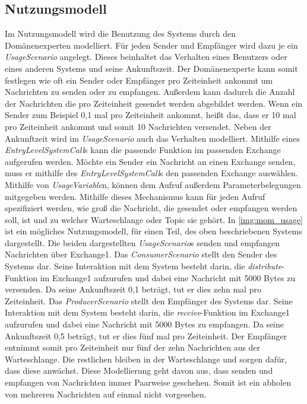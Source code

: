 \subsection{Nutzungsmodell}
Im Nutzungsmodell wird die Benutzung des Systems durch den Domänenexperten modelliert. Für jeden Sender und Empfänger wird dazu je ein \emph{UsageScenario} angelegt. Dieses beinhaltet das Verhalten eines Benutzers oder eines anderen Systems und seine Ankunftszeit. Der Domänenexperte kann somit festlegen wie oft ein Sender oder Empfänger pro Zeiteinheit ankommt um Nachrichten zu senden oder zu empfangen. Außerdem kann dadurch die Anzahl der Nachrichten die pro Zeiteinheit gesendet werden abgebildet werden. Wenn ein Sender zum Beispiel 0,1 mal pro Zeiteinheit ankommt, heißt das, dass er 10 mal pro Zeiteinheit ankommt und somit 10 Nachrichten versendet. Neben der Ankunftzeit wird im \emph{UsageScenario} auch das Verhalten modelliert. Mithilfe eines \emph{EntryLevelSystemCall}s kann die passende Funktion im passenden Exchange aufgerufen werden. Möchte ein Sender ein Nachricht an einen Exchange senden, muss er mithilfe des \emph{EntryLevelSystemCall}s den passenden Exchange auswählen. Mithilfe von \emph{UsageVariable}n, können dem Aufruf außerdem Parameterbelegungen mitgegeben werden. Mithilfe dieses Mechanismus kann für jeden Aufruf spezifiziert werden, wie groß die Nachricht, die gesendet oder empfangen werden soll, ist und zu welcher Warteschlange oder Topic sie gehört. In \autoref{img:mom_usage} ist ein mögliches Nutzungsmodell, für einen Teil, des oben beschriebenen Systems dargestellt. Die beiden dargestellten \emph{UsageScenario}s senden und empfangen Nachrichten über Exchange1. Das \emph{ConsumerScenario} stellt den Sender des Systems dar. Seine Interaktion mit dem System besteht darin, die \emph{distribute}-Funktion im Exchange1 aufzurufen und dabei eine Nachricht mit 5000 Bytes zu versenden. Da seine Ankunftszeit 0,1 beträgt, tut er dies zehn mal pro Zeiteinheit. Das \emph{ProducerScenario} stellt den Empfänger des Systems dar. Seine Interaktion mit dem System besteht darin, die \emph{receive}-Funktion im Exchange1 aufzurufen und dabei eine Nachricht mit 5000 Bytes zu empfangen. Da seine Ankunftszeit 0,5 beträgt, tut er dies fünf mal pro Zeiteinheit. Der Empfänger entnimmt somit pro Zeiteinheit nur fünf der zehn Nachrichten aus der Warteschlange. Die restlichen bleiben in der Warteschlange und sorgen dafür, dass diese anwächst. Diese Modellierung geht davon aus, dass senden und empfangen von Nachrichten immer Paarweise geschehen. Somit ist ein abholen von mehreren Nachrichten auf einmal nicht vorgesehen.

